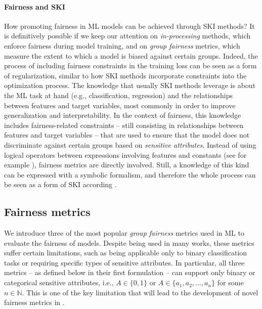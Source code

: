 \paragraph{Fairness and SKI}\label{par:fairness-ski}
%
How promoting fairness in \gls{ML} models can be achieved through \gls{SKI} methods?
%
It is definitively possible if we keep our attention on \emph{in-processing} methods, which enforce fairness during model training, and on \emph{group fairness} metrics, which measure the extent to which a model is biased against certain groups.
%
Indeed, the process of including fairness constraints in the training loss can be seen as a form of regularization, similar to how \gls{SKI} methods incorporate constraints into the optimization process.
%
The knowledge that usually \gls{SKI} methods leverage is about the \gls{ML} task at hand (e.g., classification, regression) and the relationships between features and target variables, most commonly in order to improve generalization and interpretability.
%
In the context of fairness, this knowledge includes fairness-related constraints -- still consisting in relationships between features and target variables -- that are used to ensure that the model does not discriminate against certain groups based on \emph{sensitive attributes}.
%
Instead of using logical operators between expressions involving features and constants (see for example ), fairness metrics are directly involved.
%
Still, a knowledge of this kind can be expressed with a symbolic formalism, and therefore the whole process can be seen as a form of \gls{SKI} according .


\subsection{Fairness metrics}\label{subsec:fairness-metrics}
%
We introduce three of the most popular \emph{group fairness} metrics used in \gls{ML} to evaluate the fairness of models.
%
Despite being used in many works, these metrics suffer certain limitations, such as being applicable only to binary classification tasks or requiring specific types of sensitive attributes.
%
In particular, all three metrics -- as defined below in their first formulation -- can support only binary or categorical sensitive attributes, i.e., \( A \in \{0, 1\} \) or \( A \in \{a_1, a_2, \ldots, a_n\} \) for some \( n \in \mathbb{N} \).
%
This is one of the key limitation that will lead to the development of novel fairness metrics in .


